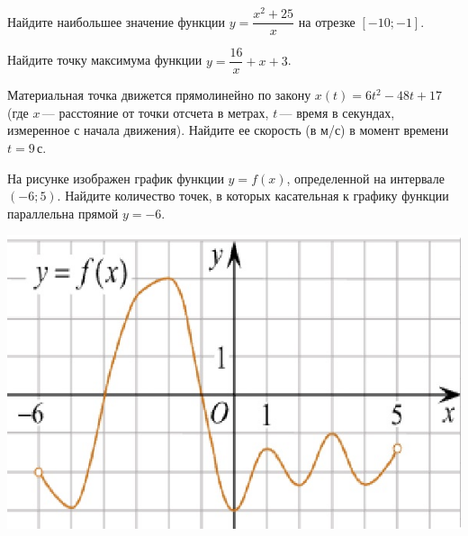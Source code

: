 \begin{homework}[number=2]
\begin{listofex}
		\item Найдите наибольшее значение функции \(y=\dfrac{ x^2+25 }{ x }\) на отрезке \(\left[ -10;-1 \right]\).
		\item Найдите точку максимума функции \(y=\dfrac{ 16 }{ x }+x+3\).
		
		
		\item Материальная точка движется прямолинейно по закону \( x(t)=6t^2-48t+17 \) (где \(x\) --- расстояние от точки отсчета в метрах, \(t\) --- время в секундах, измеренное с начала движения). Найдите ее скорость (в м/с) в момент времени \(t  =  9\) с.
		\item
		\begin{minipage}[t]{0.5\linewidth}
			На рисунке изображен график функции \(y = f(x)\), определенной на интервале \((-6; 5)\). Найдите количество точек, в которых касательная к графику функции параллельна прямой \(y=-6\).
		\end{minipage}
		\hspace{0.02\linewidth}
		\begin{minipage}[t]{0.45\linewidth}
			\includegraphics[align=t, width=\linewidth]{../pics/G111M3H2-4}
		\end{minipage}
		
	\end{listofex}
\end{homework}

